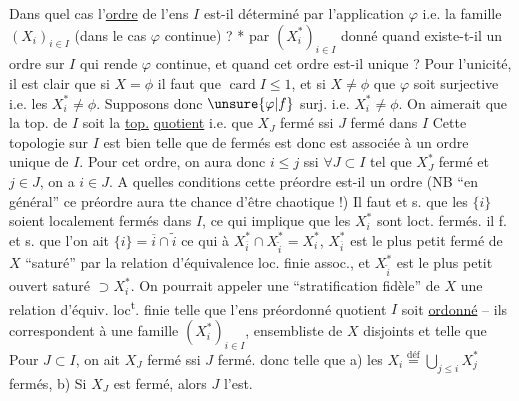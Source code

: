 Dans quel cas l'\uline{ordre} de l'ens $I$ est-il déterminé
par l'application $\varphi$ i.e. la famille $(X_i)_{i\in I}$ (dans le
cas $\varphi$ continue) ? *    par $(X_i^*)_{i\in I}$ donné
quand  existe-t-il un ordre sur $I$ qui rende $\varphi$
continue, et quand cet ordre est-il unique ?
Pour l'unicité, il est clair que si $X=\phi$ il
faut que $\operatorname{card}I\leq1$, et si $X\ne\phi$ que $\varphi$ soit
surjective i.e. les $X_i^*\ne\phi$. Supposons donc $\unsure{\varphi|f}$ surj. i.e.
$X_i^*\ne\phi$. On aimerait que la top. de $I$ soit la \uline{top.}
\uline{quotient} i.e. que $X_J$ fermé ssi $J$ fermé dans $I$
Cette topologie sur $I$ est bien telle que 
de fermés est   donc est associée à un ordre
unique de $I$. Pour cet ordre, on aura donc
$i\leq j$ ssi  $\forall J\subset I$ tel que $X_J^*$ fermé et $j\in J$, on
a $i\in J$. A quelles conditions cette préordre est-il
un ordre (NB ``en général'' ce préordre aura tte
chance d'être chaotique !) Il faut et s. que
les $\{i\}$ soient localement fermés dans $I$, ce
qui implique que les $X_i^*$ sont loct. fermés.  
  il f. et s. que  l'on ait 
$\{i\}=\overline i\cap\widetilde i$ ce qui  à 
$X_{\overline i}^*\cap X_{\widetilde i}^*=X_i^*$,
 $X_{\overline i}^*$ est le plus petit fermé de $X$  ``saturé'' par la
relation d'équivalence loc. finie assoc., et $X_{\widetilde i}^*$ est le
plus petit ouvert saturé $\supset X_i^*$. On pourrait appeler
une ``stratification fidèle'' de $X$ une relation d'équiv.
loc\textsuperscript{t}. finie telle que l'ens préordonné quotient
$I$ soit \uline{ordonné} -- ils correspondent à une famille
$(X_i^*)_{i\in I}$,  ensembliste de $X$ 
 
disjoints et telle que
Pour $J\subset I$, on ait $X_J$ fermé ssi $J$ fermé.
donc telle que a) les $X_i\overset{\mathrm{déf}}=\bigcup_{j\leq i}X_j^*$ fermés,
b) Si $X_J$ est fermé, alors $J$ l'est.

